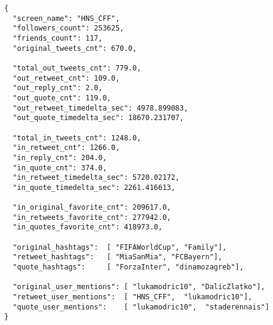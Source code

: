 \begin{code}
\label{subsubsec:methods-data-analysis:eda:expand-user}
\begin{verbatim}
{
  "screen_name": "HNS_CFF",
  "followers_count": 253625,
  "friends_count": 117,
  "original_tweets_cnt": 670.0,
  
  "total_out_tweets_cnt": 779.0,
  "out_retweet_cnt": 109.0,
  "out_reply_cnt": 2.0,
  "out_quote_cnt": 119.0,
  "out_retweet_timedelta_sec": 4978.899083,
  "out_quote_timedelta_sec": 18670.231707,
  
  "total_in_tweets_cnt": 1248.0,
  "in_retweet_cnt": 1266.0,
  "in_reply_cnt": 204.0,
  "in_quote_cnt": 374.0,
  "in_retweet_timedelta_sec": 5720.02172,
  "in_quote_timedelta_sec": 2261.416613,  
  
  "in_original_favorite_cnt": 209617.0,
  "in_retweets_favorite_cnt": 277942.0,
  "in_quotes_favorite_cnt": 418973.0,

  "original_hashtags":  [ "FIFAWorldCup", "Family"],
  "retweet_hashtags":   [ "MiaSanMia", "FCBayern"],
  "quote_hashtags":     [ "ForzaInter", "dinamozagreb"],
  
  "original_user_mentions": [ "lukamodric10", "DalicZlatko"],
  "retweet_user_mentions":  [ "HNS_CFF",  "lukamodric10"],
  "quote_user_mentions":    [ "lukamodric10",  "staderennais"]
}

\end{verbatim}
\end{code}
